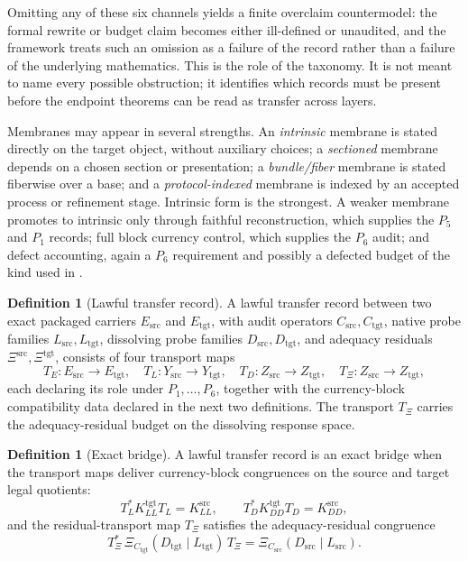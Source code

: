 \documentclass[11pt]{article}
\newcommand{\XiRes}{\Xi}
\theoremstyle{definition}
\newtheorem{definition}[theorem]{Definition}
\begin{document}
Omitting any of these six channels yields a finite overclaim
countermodel: the formal rewrite or budget claim becomes either
ill-defined or unaudited, and the framework treats such an omission as
a failure of the record rather than a failure of the underlying
mathematics.  This is the role of the taxonomy.  It is not meant to
name every possible obstruction; it identifies which records must be
present before the endpoint theorems can be read as transfer across
layers.

Membranes may appear in several strengths.  An \emph{intrinsic}
membrane is stated directly on the target object, without auxiliary
choices; a \emph{sectioned} membrane depends on a chosen section or
presentation; a \emph{bundle/fiber} membrane is stated fiberwise over a
base; and a \emph{protocol-indexed} membrane is indexed by an accepted
process or refinement stage.  Intrinsic form is the strongest.  A
weaker membrane promotes to intrinsic only through faithful
reconstruction, which supplies the \(P_5\) and \(P_1\) records; full
block currency control, which supplies the \(P_6\) audit; and defect
accounting, again a \(P_6\) requirement and possibly a defected budget
of the kind used in .

\begin{definition}[Lawful transfer record]\label{def:main:lawful-transfer}
A lawful transfer record between two exact packaged carriers
\(E_{\mathrm{src}}\) and \(E_{\mathrm{tgt}}\), with audit operators
\(C_{\mathrm{src}},C_{\mathrm{tgt}}\), native probe families
\(L_{\mathrm{src}},L_{\mathrm{tgt}}\), dissolving probe families
\(D_{\mathrm{src}},D_{\mathrm{tgt}}\), and adequacy residuals
\(\XiRes^{\mathrm{src}},\XiRes^{\mathrm{tgt}}\), consists of four
transport maps
\[
  T_E:E_{\mathrm{src}}\to E_{\mathrm{tgt}},\quad
  T_L:Y_{\mathrm{src}}\to Y_{\mathrm{tgt}},\quad
  T_D:Z_{\mathrm{src}}\to Z_{\mathrm{tgt}},\quad
  T_\Xi:Z_{\mathrm{src}}\to Z_{\mathrm{tgt}},
\]
each declaring its role under \(P_1,\ldots,P_6\), together with the
currency-block compatibility data declared in the next two definitions.
The transport \(T_\Xi\) carries the adequacy-residual budget on the
dissolving response space.
\end{definition}

\begin{definition}[Exact bridge]\label{def:main:exact-bridge}
A lawful transfer record is an exact bridge when the transport maps
deliver currency-block congruences on the source and target legal
quotients:
\[
  T_L^*K^{\mathrm{tgt}}_{LL}T_L=K^{\mathrm{src}}_{LL},
  \qquad
  T_D^*K^{\mathrm{tgt}}_{DD}T_D=K^{\mathrm{src}}_{DD},
\]
and the residual-transport map \(T_\Xi\) satisfies the adequacy-residual
congruence
\[
  T_\Xi^*\,\XiRes_{C_{\mathrm{tgt}}}(D_{\mathrm{tgt}}\mid L_{\mathrm{tgt}})\,
  T_\Xi
  =
  \XiRes_{C_{\mathrm{src}}}(D_{\mathrm{src}}\mid L_{\mathrm{src}}).
\]
\end{definition}
\end{document}

